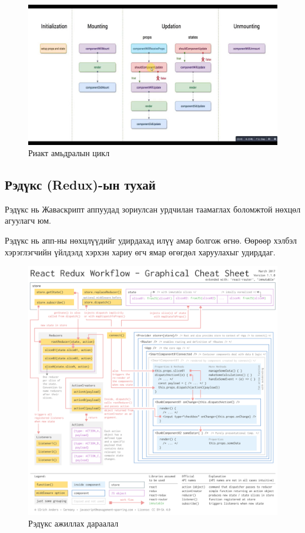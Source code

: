 \begin{figure}[H]
	\centering
	\includegraphics[width=\textwidth]{Figures/sudalgaa/react-lifecycle.jpg}
	\caption{Риакт амьдралын цикл}
	\label{figure:react-lifecycle}
\end{figure}

\subsection{Рэдүкс (Redux)-ын тухай}
Рэдүкс нь Жаваскрипт аппуудад зориулсан урдчилан таамаглах боломжтой нөхцөл агуулагч юм.

Рэдүкс нь апп-ны нөхцлүүдийг удирдахад илүү амар болгож өгнө. Өөрөөр хэлбэл хэрэглэгчийн үйлдэлд хэрхэн хариу өгч ямар өгөгдөл харуулахыг удирддаг.

\begin{figure}[H]
	\centering
	\includegraphics[width=\textwidth]{Figures/sudalgaa/redux-workflow.png}
	\caption{Рэдүкс ажиллах дараалал}
	\label{figure:redux-workflow}
\end{figure}

